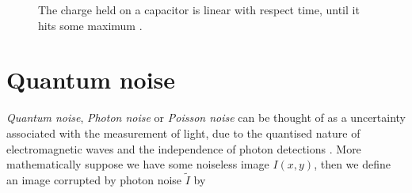 \documentclass[12pt,twoside,notitlepage]{report}
\begin{document}
        \begin{figure}[H]
            \centering


            \caption{The charge held on a capacitor is linear with respect time, until it hits some maximum \cite{gamal2005cmos}.}
            \label{fig:linear_charge_wrt_photon_rate}
        \end{figure}


    \section{Quantum noise} \label{sec:quantum_noise}
        \textit{Quantum noise}, \textit{Photon noise} or \textit{Poisson noise} can be thought of as a uncertainty 
        associated with the measurement of light, due to the quantised nature of electromagnetic waves and the 
        independence of photon detections \cite{hasinoff2014photon}. More mathematically suppose we have some 
        noiseless image $I(x,y)$, then we define an image corrupted by photon noise $\tilde{I}$ by
\end{document}
